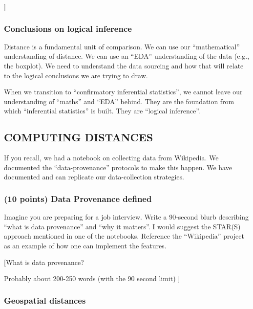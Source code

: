 \documentclass[
]{article}
\begin{document}
{]}

\hypertarget{conclusions-on-logical-inference}{%
\subsubsection{Conclusions on logical
inference}\label{conclusions-on-logical-inference}}

Distance is a fundamental unit of comparison. We can use our
``mathematical'' understanding of distance. We can use an ``EDA''
understanding of the data (e.g., the boxplot). We need to understand the
data sourcing and how that will relate to the logical conclusions we are
trying to draw.

When we transition to ``confirmatory inferential statistics'', we cannot
leave our understanding of ``maths'' and ``EDA'' behind. They are the
foundation from which ``inferential statistics'' is built. They are
``logical inference''.

\hypertarget{computing-distances}{%
\subsection{COMPUTING DISTANCES}\label{computing-distances}}

If you recall, we had a notebook on collecting data from Wikipedia. We
documented the ``data-provenance'' protocols to make this happen. We
have documented and can replicate our data-collection strategies.

\hypertarget{points-data-provenance-defined}{%
\subsubsection{(10 points) Data Provenance
defined}\label{points-data-provenance-defined}}

Imagine you are preparing for a job interview. Write a 90-second blurb
describing ``what is data provenance'' and ``why it matters''. I would
suggest the STAR(S) approach mentioned in one of the notebooks.
Reference the ``Wikipedia'' project as an example of how one can
implement the features.

{[}What is data provenance?

Probably about 200-250 words (with the 90 second limit) {]}

\hypertarget{geospatial-distances}{%
\subsubsection{Geospatial distances}\label{geospatial-distances}}
\end{document}
